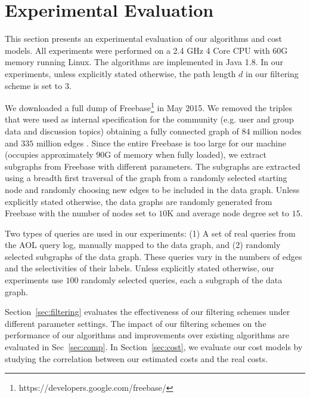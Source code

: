 \documentclass{sigmod}
\begin{document}
\section{Experimental Evaluation}
This section presents an experimental evaluation of our algorithms and cost models. All experiments were performed on a 2.4 GHz 4 Core CPU with 60G memory running Linux. The algorithms are implemented in Java 1.8. In our experiments, unless explicitly stated otherwise, the path length $d$ in our filtering scheme is set to $3$.

We downloaded a full dump of Freebase\footnote{https://developers.google.com/freebase/} in May 2015. We removed the triples that were used as internal specification for the community (e.g. user and group data and discussion topics) obtaining a fully connected graph of $84$ million nodes and $335$ million edges . Since the entire Freebase is too large for our machine (occupies approximately $90$G of memory when fully loaded), we extract subgraphs from Freebase with different parameters. The subgraphs are extracted using a breadth first traversal of the graph from a randomly selected starting node and randomly choosing new edges to be included in the data graph.  Unless explicitly stated otherwise, the data graphs are randomly generated from Freebase with the number of nodes set to $10$K and average node degree set to $15$.

Two types of queries are used in our experiments: (1) A set of real queries from the AOL query log, manually mapped to the data graph, and (2) randomly selected subgraphs of the data graph. These queries vary in the numbers of edges and the selectivities of their labels. Unless explicitly stated otherwise, our experiments use $100$ randomly selected queries, each a subgraph of the data graph. 

Section~\ref{sec:filtering} evaluates the effectiveness of our filtering schemes under different parameter settings. The impact of our filtering schemes on the performance of our algorithms and improvements over existing algorithms are evaluated in Sec~\ref{sec:comp}. In Section~\ref{sec:cost}, we evaluate our cost models by studying the correlation between our estimated costs and the real costs.   
\end{document}
